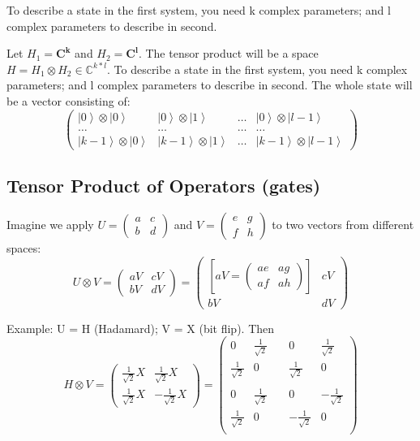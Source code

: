 \documentclass{scrartcl}
\newcommand{\cplx}{\mathbb{C}} %
\newcommand{\ket}[1]{\left| #1 \right>} %
\begin{document}
To describe a state in the first system, you need k complex parameters; and l
complex parameters to describe in second.

Let $H_1 = \mathbf{C^k}$ and $H_2 = \mathbf{C^l}$. The tensor product will be a
space $H = H_1 \otimes H_2 \in \cplx^{k*l}$. To describe a state in the first
system, you need k complex parameters; and l complex parameters to describe in
second. The whole state will be a vector consisting of:
$$\begin{pmatrix}
  \ket0 \otimes \ket0 & \ket0 \otimes \ket1& \dots& \ket0 \otimes \ket{l-1} \\
  \dots &\dots & \dots & \dots \\
  \ket{k-1}\otimes \ket0 & \ket{k-1} \otimes \ket1 & \dots & \ket{k-1} \otimes
  \ket{l-1}
\end{pmatrix}$$

\subsection{Tensor Product of Operators (gates)}
\label{sec:7-5}

Imagine we apply $U= \begin{pmatrix} a & c \\ b & d \end{pmatrix}$ and
$V= \begin{pmatrix} e & g \\ f & h \end{pmatrix}$ to two vectors from different
spaces: $$U \otimes V = \begin{pmatrix} aV & cV \\ bV & dV \end{pmatrix} =
\begin{pmatrix} \left[ aV = \begin{pmatrix} ae & ag \\ af & ah \end{pmatrix}
  \right] & cV \\ bV & dV \end{pmatrix}$$

Example: U = H (Hadamard); V = X (bit flip). Then
$$H \otimes V =\begin{pmatrix} \frac1{\sqrt2}X & \frac1{\sqrt2}X \\
  \frac1{\sqrt2}X & -\frac1{\sqrt2}X \end{pmatrix} =
\begin{pmatrix}
  0 & \frac1{\sqrt2} & \; & 0 & \frac1{\sqrt2} \\
  \frac1{\sqrt2} & 0 & \; & \frac1{\sqrt2} & 0 \\
  \; \\
  0 & \frac1{\sqrt2} & \; & 0 & -\frac1{\sqrt2} \\
  \frac1{\sqrt2} & 0 & \; & -\frac1{\sqrt2} & 0 \\
\end{pmatrix}$$
\end{document}
